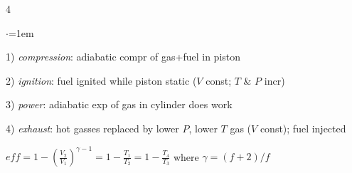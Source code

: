\documentclass[letterpaper,landscape,10pt]{article}
\newenvironment{titemize}
{\begin{list}{$\cdot$}{\leftmargin=1em}
	\setlength{\itemsep}{0pt}
	\setlength{\parskip}{0pt}
	\setlength{\parsep}{0pt}}
{\end{list}}
\begin{document}
{\begin{multicols}{4}
\begin{minipage}{\columnwidth}
\begin{minipage}{0.24\columnwidth}
	  \end{minipage}\hspace{.01\columnwidth}
	  \begin{minipage}{0.74\columnwidth}
		  \begin{titemize}
			  \item[1)] \emph{compression}: adiabatic compr of gas+fuel in piston\\
			  \item[2)] \emph{ignition}: fuel ignited while piston static ($V$ const; $T$ \& $P$ incr)\\
			  \item[3)] \emph{power}: adiabatic exp of gas in cylinder does work \\
			  \item[4)] \emph{exhaust}: hot gasses replaced by lower $P$, lower $T$ gas ($V$ const); fuel injected \\
		  \end{titemize}
		  \vspace{-10pt}
		{$eff = 1-\left( \frac{V_2}{V_1}\right) ^{\gamma-1} = 1 - \frac{T_1}{T_2} = 1 - \frac{T_4}{T_3}$} where $\gamma=(f+2)/f$ \\
	  \end{minipage}
	  \end{minipage}\\

\end{multicols}}
\end{document}
